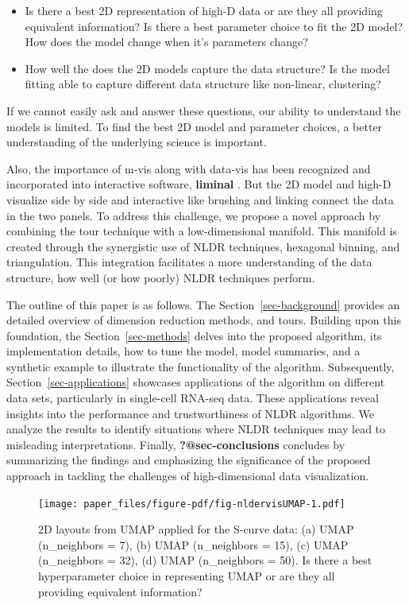 \documentclass[
  12pt]{article}
\begin{document}
\begin{itemize}
\item
  Is there a best 2D representation of high-D data or are they all
  providing equivalent information? Is there a best parameter choice to
  fit the 2D model? How does the model change when it's parameters
  change?
\item
  How well the does the 2D models capture the data structure? Is the
  model fitting able to capture different data structure like
  non-linear, clustering?
\end{itemize}

If we cannot easily ask and answer these questions, our ability to
understand the models is limited. To find the best 2D model and
parameter choices, a better understanding of the underlying science is
important.

Also, the importance of m-vis along with data-vis has been recognized
and incorporated into interactive software, \textbf{liminal}
\citep{article21}. But the 2D model and high-D visualize side by side
and interactive like brushing and linking connect the data in the two
panels. To address this challenge, we propose a novel approach by
combining the tour technique with a low-dimensional manifold. This
manifold is created through the synergistic use of NLDR techniques,
hexagonal binning, and triangulation. This integration facilitates a
more understanding of the data structure, how well (or how poorly) NLDR
techniques perform.

The outline of this paper is as follows. The
Section~\ref{sec-background} provides an detailed overview of dimension
reduction methods, and tours. Building upon this foundation, the
Section~\ref{sec-methods} delves into the proposed algorithm, its
implementation details, how to tune the model, model summaries, and a
synthetic example to illustrate the functionality of the algorithm.
Subsequently, Section~\ref{sec-applications} showcases applications of
the algorithm on different data sets, particularly in single-cell
RNA-seq data. These applications reveal insights into the performance
and trustworthiness of NLDR algorithms. We analyze the results to
identify situations where NLDR techniques may lead to misleading
interpretations. Finally, \textbf{?@sec-conclusions} concludes by
summarizing the findings and emphasizing the significance of the
proposed approach in tackling the challenges of high-dimensional data
visualization.

\begin{figure}

{\centering \texttt{[image: paper\_files/figure-pdf/fig-nldervisUMAP-1.pdf]}

}

\caption{\label{fig-nldervisUMAP}2D layouts from UMAP applied for the
S-curve data: (a) UMAP (n\_neighbors = 7), (b) UMAP (n\_neighbors = 15),
(c) UMAP (n\_neighbors = 32), (d) UMAP (n\_neighbors = 50). Is there a
best hyperparameter choice in representing UMAP or are they all
providing equivalent information?}

\end{figure}
\end{document}
